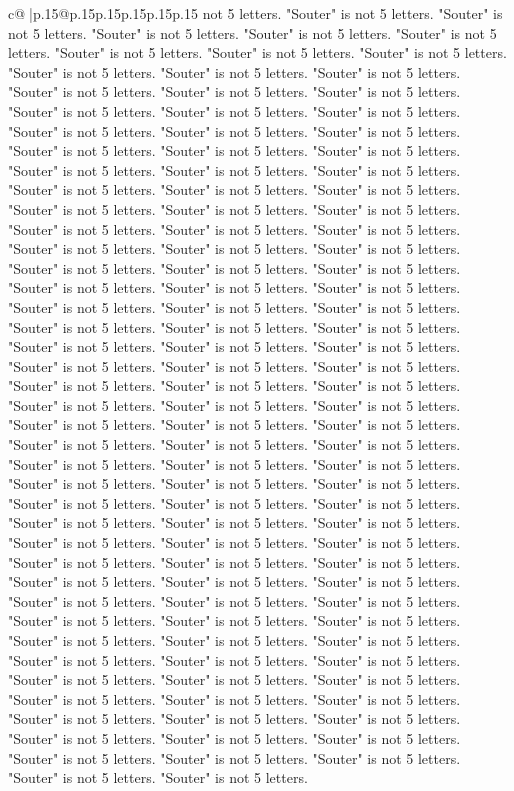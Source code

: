 \documentclass{article}
\begin{document}
{\begin{supertabular}{c@{$\;$}|p{.15\linewidth}@{}p{.15\linewidth}p{.15\linewidth}p{.15\linewidth}p{.15\linewidth}p{.15\linewidth}}
{{{not 5 letters. "Souter" is not 5 letters. "Souter" is not 5 letters. "Souter" is not 5 letters. "Souter" is not 5 letters. "Souter" is not 5 letters. "Souter" is not 5 letters. "Souter" is not 5 letters. "Souter" is not 5 letters. "Souter" is not 5 letters. "Souter" is not 5 letters. "Souter" is not 5 letters. "Souter" is not 5 letters. "Souter" is not 5 letters. "Souter" is not 5 letters. "Souter" is not 5 letters. "Souter" is not 5 letters. "Souter" is not 5 letters. "Souter" is not 5 letters. "Souter" is not 5 letters. "Souter" is not 5 letters. "Souter" is not 5 letters. "Souter" is not 5 letters. "Souter" is not 5 letters. "Souter" is not 5 letters. "Souter" is not 5 letters. "Souter" is not 5 letters. "Souter" is not 5 letters. "Souter" is not 5 letters. "Souter" is not 5 letters. "Souter" is not 5 letters. "Souter" is not 5 letters. "Souter" is not 5 letters. "Souter" is not 5 letters. "Souter" is not 5 letters. "Souter" is not 5 letters. "Souter" is not 5 letters. "Souter" is not 5 letters. "Souter" is not 5 letters. "Souter" is not 5 letters. "Souter" is not 5 letters. "Souter" is not 5 letters. "Souter" is not 5 letters. "Souter" is not 5 letters. "Souter" is not 5 letters. "Souter" is not 5 letters. "Souter" is not 5 letters. "Souter" is not 5 letters. "Souter" is not 5 letters. "Souter" is not 5 letters. "Souter" is not 5 letters. "Souter" is not 5 letters. "Souter" is not 5 letters. "Souter" is not 5 letters. "Souter" is not 5 letters. "Souter" is not 5 letters. "Souter" is not 5 letters. "Souter" is not 5 letters. "Souter" is not 5 letters. "Souter" is not 5 letters. "Souter" is not 5 letters. "Souter" is not 5 letters. "Souter" is not 5 letters. "Souter" is not 5 letters. "Souter" is not 5 letters. "Souter" is not 5 letters. "Souter" is not 5 letters. "Souter" is not 5 letters. "Souter" is not 5 letters. "Souter" is not 5 letters. "Souter" is not 5 letters. "Souter" is not 5 letters. "Souter" is not 5 letters. "Souter" is not 5 letters. "Souter" is not 5 letters. "Souter" is not 5 letters. "Souter" is not 5 letters. "Souter" is not 5 letters. "Souter" is not 5 letters. "Souter" is not 5 letters. "Souter" is not 5 letters. "Souter" is not 5 letters. "Souter" is not 5 letters. "Souter" is not 5 letters. "Souter" is not 5 letters. "Souter" is not 5 letters. "Souter" is not 5 letters. "Souter" is not 5 letters. "Souter" is not 5 letters. "Souter" is not 5 letters. "Souter" is not 5 letters. "Souter" is not 5 letters. "Souter" is not 5 letters. "Souter" is not 5 letters. "Souter" is not 5 letters. "Souter" is not 5 letters. "Souter" is not 5 letters. "Souter" is not 5 letters. "Souter" is not 5 letters. "Souter" is not 5 letters. "Souter" is not 5 letters. "Souter" is not 5 letters. "Souter" is not 5 letters. "Souter" is not 5 letters. "Souter" is not 5 letters. "Souter" is not 5 letters. "Souter" is not 5 letters. "Souter" is not 5 letters. "Souter" is not 5 letters. "Souter" is not 5 letters. "Souter" is not 5 letters. "Souter" is not 5 letters. "Souter" is not 5 letters. "Souter" is not 5 letters. "Souter" is not 5 letters. "Souter" is not 5 letters. "Souter" is not 5 letters. "Souter" is not 5 letters. "Souter" is not 5 letters. }}}
\end{supertabular}}
\end{document}

